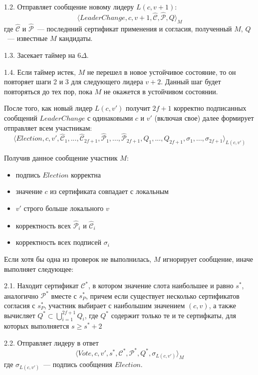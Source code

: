 1.2. Отправляет сообщение новому лидеру $L(c, v+1)$:
\[ \langle LeaderChange, c, v+1,  \hat{\mathcal{C}}, \hat{\mathcal{P}}, Q \rangle_M \]
где $\hat{\mathcal{C}}$ и $\hat{\mathcal{P}}$~--- последнний сертификат применения и согласия, полученный $M$, $Q$~--- известные $M$ кандидаты.

1.3. Засекает таймер на $6\Delta$.

1.4. Если таймер истек, $M$ не перешел в новое устойчивое состояние, то он повторяет шаги 2 и 3 для следующего лидера $v+2$. Данный шаг будет повторяться до тех пор, пока $M$ не окажется в устойчивом состоянии.
\vspace{10pt}

После того, как новый лидер $L(c, v')$ получит $2f+1$ корректно подписанных сообщений $LeaderChange$ с одинаковыми $c$ и $v'$  (включая свое) далее формирует отправляет всем участникам:
\[ \langle Election, c, v', \hat{\mathcal{C}}_1,...,\hat{\mathcal{C}}_{2f+1}, \hat{\mathcal{P}}_1,...,\hat{\mathcal{P}}_{2f+1}, Q_1,..., Q_{2f+1}, \sigma_1,..., \sigma_{2f+1}\rangle_{L(c, v')} \]

Получив данное сообщение участник $M$:
\begin{itemize}
\item подпись $Election$ корректна
\item значение $c$ из сертификата совпадает с локальным
\item $v'$ строго больше локального $v$
\item корректность всех $\hat{\mathcal{P}}_i$ и $\hat{\mathcal{C}}_i$
\item корректность всех подписей $\sigma_i$
\end{itemize}
Если хотя бы одна из проверок не выполнилась, $M$ игнорирует сообщение, иначе выполняет следующее:

2.1. Находит сертификат $\mathcal{C}^{*}$, в котором значение слота наибольшее и равно $s^{*}$, аналогично $\mathcal{P}^{*}$ вместе с  $s_P^{*}$, причем если существует несколько сертификатов согласия с $s_P^{*}$, участник выбирает с наибольшим значением $(c, v)$, а также вычисляет $Q^{*} \subset \bigcup\limits_{i=1}^{2f+1} Q_i$, где $Q^{*}$ содержит только те и те сертифкаты, для которых выполняется $s \ge s^{*}+2$

2.2. Отправляет лидеру в ответ
\[ \langle Vote, c, v', s^{*}, \mathcal{C}^{*}, \mathcal{P}^{*}, Q^{*}, \sigma_{L(c, v')} \rangle_M \]
где $\sigma_{L(c, v')}$~--- подпись сообщения $Election$.
\vspace{10pt}

